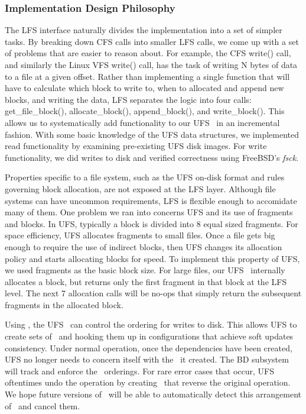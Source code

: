 \subsubsection {Implementation Design Philosophy}
The LFS interface naturally divides the implementation into a set of simpler
tasks. By breaking down CFS calls into smaller LFS calls, we come up with a
set of problems that are easier to reason about. For example, the CFS write()
call, and similarly the Linux VFS write() call, has the task of writing N
bytes of data to a file at a given offset. Rather than implementing a single
function that will have to calculate which block to write to, when to
allocated and append new blocks, and writing the data, LFS separates the
logic into four calls:
get\_file\_block(), allocate\_block(), append\_block(), and write\_block().
This allows us to systematically add functionality to our UFS \module\ in
an incremental fashion. With some basic knowledge of the UFS data structures,
we implemented read functionality by examining pre-existing UFS disk images.
For write functionality, we did writes to disk and verified correctness using
FreeBSD's \emph{fsck}.

Properties specific to a file system, such as the UFS on-disk format and rules
governing block allocation, are not exposed at the LFS layer. Although file
systems can have uncommon requirements, LFS is flexible enough to accomidate
many of them. One problem we ran into concerns UFS and its use of fragments
and blocks. In UFS, typically a block is divided into 8 equal sized fragments.
For space efficiency, UFS allocates fragments to small files. Once a file gets
big enough to require the use of indirect blocks, then UFS changes its
allocation policy and starts allocating blocks for speed. To implement this
property of UFS, we used fragments as the basic block size. For large files,
our UFS \module\ internally allocates a block, but returns only the first
fragment in that block at the LFS level. The next 7 allocation calls will be
no-ops that simply return the subsequent fragments in the allocated block.

Using \chdescs, the UFS \module\ can control the ordering for writes to disk.
This allows UFS to create sets of \chdescs\ and hooking them up in
configurations that achieve soft updates consistency. Under normal operation,
once the dependencies have been created, UFS no longer needs to concern itself
with the \chdescs\ it created. The BD subsystem will track and enforce the
\chdesc\ orderings. For rare error cases that occur, UFS oftentimes
undo the operation by creating \chdescs\ that reverse the original operation.
We hope future versions of \Kudos\ will be able to automatically detect this
arrangement of \chdescs\ and cancel them.

